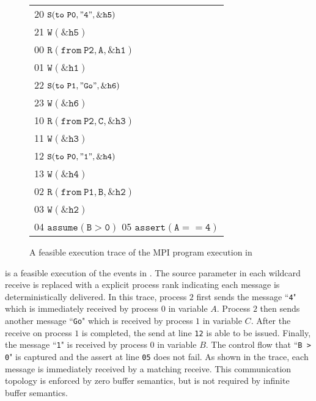 \begin{figure}[b]
\begin{center}
\setlength{\tabcolsep}{2pt}
\small \begin{tabular}[t]{l}
20 $\mathtt{S(to\ P0, "4", \&h5)}$ \\
21 $\mathtt{W(\&h5)}$\\
\hline
00 $\mathtt{R(from\ P2, A, \&h1)}$ \\
01 $\mathtt{W(\&h1)}$ \\
\hline
22 $\mathtt{S(to\ P1, "Go", \&h6)}$ \\
23 $\mathtt{W(\&h6)}$ \\
\hline
10 $\mathtt{R(from\ P2, C, \&h3)}$ \\
11 $\mathtt{W(\&h3)}$ \\
12 $\mathtt{S(to\ P0, "1", \&h4)}$ \\
13 $\mathtt{W(\&h4)}$ \\
\hline
02 $\mathtt{R(from\ P1, B, \&h2)}$ \\
03 $\mathtt{W(\&h2)}$ \\
04 $\mathtt{assume(B > 0)}$
05 $\mathtt{assert(A == 4)}$ \\
\hline
\end{tabular}
\end{center}
\caption{A feasible execution trace of the MPI program execution in }
\label{fig:trace1}
\end{figure}

 is a feasible execution of the events in . The source parameter in each wildcard receive is replaced with a explicit process rank indicating each message is deterministically delivered. In this trace, process $2$ first sends the message ``\texttt{4}" which is immediately received by process $0$ in variable $A$. Process $2$ then sends another message ``\texttt{Go}" which is received by process $1$ in variable $C$. After the receive on process $1$ is completed, the send at line \texttt{12} is able to be issued. Finally, the message ``\texttt{1}" is received by process $0$ in variable $B$. The control flow that ``\texttt{B > 0}" is captured and the assert at line \texttt{05} does not fail. As shown in the trace, each message is immediately received by a matching receive. This communication topology is enforced by zero buffer semantics, but is not required by infinite buffer semantics.


